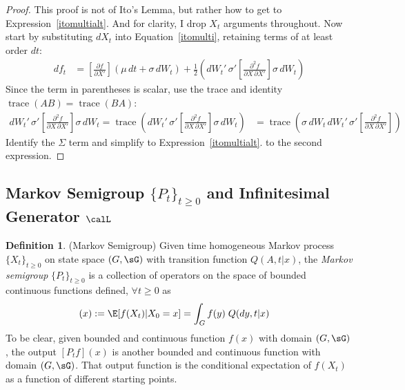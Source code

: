 \documentclass[12pt]{article}
\theoremstyle{plain}
\theoremstyle{definition}
\newtheorem{defn}[thm]{Definition}
\theoremstyle{remark}
\newcommand{\trace}{\operatorname{trace}}
\begin{document}
\begin{proof}
This proof is not of Ito's Lemma, but rather how to get to
Expression~\ref{itomultialt}.
And for clarity, I drop $X_t$ arguments throughout.
Now start by substituting $dX_t$ into Equation~\ref{itomulti}, retaining
terms of at least order $dt$:
\begin{align*}
  df_t
  &=
  \left[
  \frac{\partial f}{\partial X'}
  \right]
  \left(
  \mu
  \,dt
  +
  \sigma
  \,dW_t
  \right)
  +
  \frac{1}{2}
  \left(
  dW_t'\,
  \sigma'
  \left[
  \frac{\partial^2 f}{\partial X\,\partial X'}
  \right]
  \sigma
  \,dW_t
  \right)
\end{align*}
Since the term in parentheses is scalar, use the trace and identity
$\trace(AB)=\trace(BA)$:
\begin{align*}
  dW_t'\,
  \sigma'
  \left[
  \frac{\partial^2 f}{\partial X\,\partial X'}
  \right]
  \sigma
  \,dW_t
  =
  \trace\left(
  dW_t'\,
  \sigma'
  \left[
  \frac{\partial^2 f}{\partial X\,\partial X'}
  \right]
  \sigma
  \,dW_t
  \right)
  &=
  \trace\left(
  \sigma
  \,dW_t
  \,dW_t'
  \,\sigma'
  \left[
  \frac{\partial^2 f}{\partial X\,\partial X'}
  \right]
  \right)
\end{align*}
Identify the $\Sigma$ term and simplify to Expression~\ref{itomultialt}.
to the second expression.
\end{proof}



\clearpage
\subsection{%
  Markov Semigroup $\{P_t\}_{t\geq 0}$ and Infinitesimal Generator
  $\calL$
}


\begin{defn}(Markov Semigroup)
Given time homogeneous Markov process $\{X_t\}_{t\geq 0}$ on state space
$(G,\sG)$ with transition function $Q(A,t|x)$, the
\emph{Markov semigroup} $\{P_t\}_{t\geq 0}$ is a collection of operators
on the space of bounded continuous functions defined, $\forall t\geq 0$
as
\begin{align*}
  [P_tf](x)
  &:=
  \E[f(X_t)|X_0=x]
  =
  \int_G
  f(y)
  \;Q(dy,t|x)
\end{align*}
To be clear, given bounded and continuous function $f(x)$ with domain
$(G,\sG)$, the output $[P_tf](x)$ is another bounded and continuous
function with domain $(G,\sG)$.
That output function is the conditional expectation of $f(X_t)$ as a
function of different starting points.
\end{defn}
\end{document}
